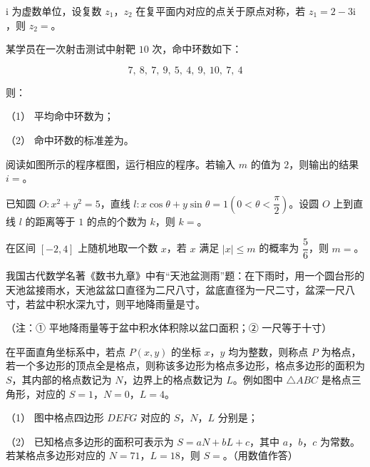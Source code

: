 \begin{question}
$\mathrm i$ 为虚数单位，设复数 $z_1$，$z_2$ 在复平面内对应的点关于原点对称，若 $z_1=2-3\mathrm i$，则 $z_2=$\gkblank{}。

\end{question}
\begin{question}
某学员在一次射击测试中射靶 $10$ 次，命中环数如下：

\nopagebreak[4]
\[7,\ 8,\ 7,\ 9,\ 5,\ 4,\ 9,\ 10,\ 7,\ 4\]

则：

（1） 平均命中环数为\gkblank{}；

（2） 命中环数的标准差为\gkblank{}。

\Needspace{0.4\textheight}
\end{question}
\begin{question}
阅读如图所示的程序框图，运行相应的程序。若输入 $m$ 的值为 $2$，则输出的结果 $i=$\gkblank{}。
\nopagebreak[4]
\begin{center}\end{center}
\nopagebreak[4]
\end{question}
\begin{question}
已知圆 $O:x^2+y^2=5$，直线 $l:x\cos\theta+y\sin\theta=1\left(0<\theta<\dfrac\pi2\right)$。设圆 $O$ 上到直线 $l$ 的距离等于 $1$ 的点的个数为 $k$，则 $k=$\gkblank{}。

\end{question}
\begin{question}
在区间 $[-2,4]$ 上随机地取一个数 $x$，若 $x$ 满足 $|x|\leqslant m$ 的概率为 $\dfrac56$，则 $m=$\gkblank{}。

\end{question}
\begin{question}
我国古代数学名著《数书九章》中有“天池盆测雨”题：在下雨时，用一个圆台形的天池盆接雨水，天池盆盆口直径为二尺八寸，盆底直径为一尺二寸，盆深一尺八寸，若盆中积水深九寸，则平地降雨量是\gkblank{}寸。

（注：① 平地降雨量等于盆中积水体积除以盆口面积；② 一尺等于十寸）

\Needspace{0.4\textheight}
\end{question}
\begin{question}
在平面直角坐标系中，若点 $P(x,y)$ 的坐标 $x$，$y$ 均为整数，则称点 $P$ 为格点，若一个多边形的顶点全是格点，则称该多边形为格点多边形，格点多边形的面积为 $S$，其内部的格点数记为 $N$，边界上的格点数记为 $L$。例如图中 $\triangle ABC$ 是格点三角形，对应的 $S=1$，$N=0$，$L=4$。
\nopagebreak[4]
\begin{center}\end{center}
\nopagebreak[4]
（1） 图中格点四边形 $DEFG$ 对应的 $S$，$N$，$L$ 分别是\gkblank{}；

（2） 已知格点多边形的面积可表示为 $S=aN+bL+c$，其中 $a$，$b$，$c$ 为常数。若某格点多边形对应的 $N=71$，$L=18$，则 $S=$\gkblank{}。（用数值作答）

\end{question}

